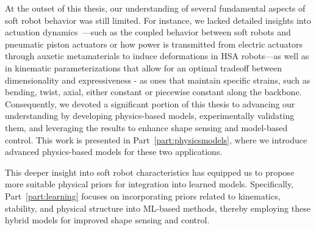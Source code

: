 At the outset of this thesis, our understanding of several fundamental aspects of soft robot behavior was still limited. For instance, we lacked detailed insights into actuation dynamics~\citep{della2023model}—such as the coupled behavior between soft robots and pneumatic piston actuators or how power is transmitted from electric actuators through auxetic metamaterials to induce deformations in \gls{HSA} robots—as well as in kinematic parameterizations that allow for an optimal tradeoff between dimensionality and expressiveness - as ones that maintain specific strains, such as bending, twist, axial, either constant or piecewise constant along the backbone. Consequently, we devoted a significant portion of this thesis to advancing our understanding by developing physics-based models, experimentally validating them, and leveraging the results to enhance shape sensing and model-based control. This work is presented in Part~\ref{part:physicsmodels}, where we introduce advanced physics-based models for these two applications.

This deeper insight into soft robot characteristics has equipped us to propose more suitable physical priors for integration into learned models. Specifically, Part~\ref{part:learning} focuses on incorporating priors related to kinematics, stability, and physical structure into \gls{ML}-based methods, thereby employing these hybrid models for improved shape sensing and control. 

